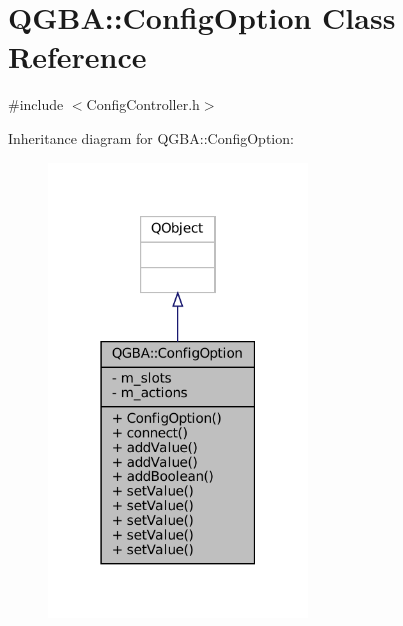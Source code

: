 \hypertarget{class_q_g_b_a_1_1_config_option}{}\section{Q\+G\+BA\+:\+:Config\+Option Class Reference}
\label{class_q_g_b_a_1_1_config_option}


{\ttfamily \#include $<$Config\+Controller.\+h$>$}



Inheritance diagram for Q\+G\+BA\+:\+:Config\+Option\+:
\nopagebreak
\begin{figure}[H]
\begin{center}
\leavevmode
\includegraphics[width=195pt]{class_q_g_b_a_1_1_config_option__inherit__graph}
\end{center}
\end{figure}


